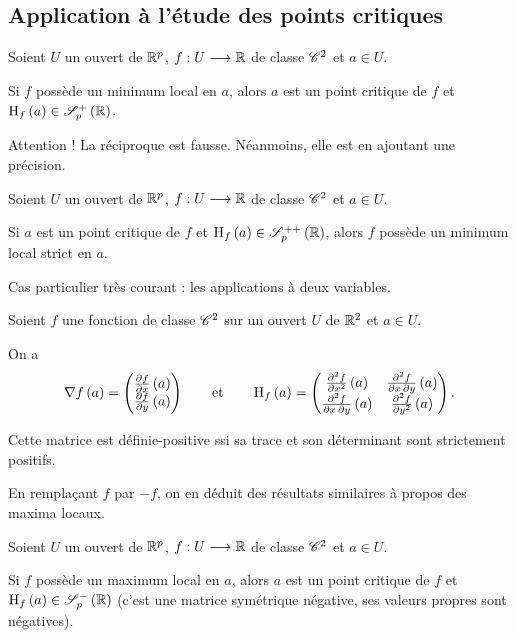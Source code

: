 \subsection{Application à l'étude des points critiques}

\begin{prop}
Soient \(U\) un ouvert de \(\mathbb{R}^p\), \(f:U\longrightarrow\mathbb{R}\) de classe \(\mathscr{C}^{2}\) et \(a\in U\).

Si \(f\) possède un minimum local en \(a\), alors \(a\) est un point critique de \(f\) et \(\hessienne{f}\paren{a}\in\sympos{p}[\R]\).
\end{prop}

\begin{rem}
Attention ! La réciproque est fausse. Néanmoins, elle est  en ajoutant une précision.
\end{rem}

\begin{prop}
Soient \(U\) un ouvert de \(\mathbb{R}^p\), \(f:U\longrightarrow\mathbb{R}\) de classe \(\mathscr{C}^{2}\) et \(a\in U\).

Si \(a\) est un point critique de \(f\) et \(\hessienne{f}\paren{a}\in\symdefpos{p}[\R]\), alors \(f\) possède un minimum local strict en \(a\).
\end{prop}

Cas particulier très courant : les applications à deux variables.

Soient \(f\) une fonction de classe \(\mathscr{C}^{2}\) sur un ouvert \(U\) de \(\mathbb{R}^2\) et \(a\in U\).

On a \[\nabla f\left(a\right)=\begin{pmatrix}\pdv{f}{x}\left(a\right)\\\pdv{f}{y}\left(a\right)\end{pmatrix}\qquad\text{et}\qquad\operatorname{H}_{f}\left(a\right)=\begin{pmatrix}
\pdv[order=2]{f}{x}\left(a\right) & \pdv{f}{x,y}\left(a\right) \\
\pdv{f}{x,y}\left(a\right) & \pdv[order=2]{f}{y}\left(a\right)
\end{pmatrix}.\]

Cette matrice est définie-positive ssi sa trace et son déterminant sont strictement positifs.

En remplaçant \(f\) par \(-f\), on en déduit des résultats similaires à propos des maxima locaux.

\begin{prop}
Soient \(U\) un ouvert de \(\mathbb{R}^p\), \(f:U\longrightarrow\mathbb{R}\) de classe \(\mathscr{C}^{2}\) et \(a\in U\).

Si \(f\) possède un maximum local en \(a\), alors \(a\) est un point critique de \(f\) et \(\hessienne{f}\paren{a}\in\symneg{p}[\R]\) (\ie c'est une matrice symétrique négative, ses valeurs propres sont négatives).
\end{prop}

